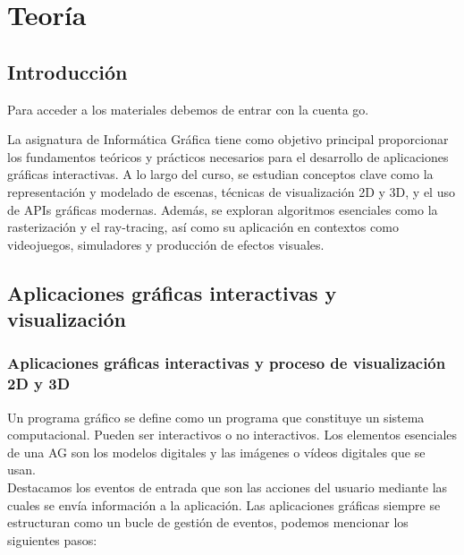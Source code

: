 \documentclass[12pt]{report} %
\begin{document}
\part{Teoría}

\hypertarget{introducciuxf3n}{%
\chapter{Introducción}\label{introducciuxf3n}}

Para acceder a los materiales debemos de entrar con la cuenta go.

La asignatura de Informática Gráfica tiene como objetivo principal
proporcionar los fundamentos teóricos y prácticos necesarios para el
desarrollo de aplicaciones gráficas interactivas. A lo largo del curso,
se estudian conceptos clave como la representación y modelado de
escenas, técnicas de visualización 2D y 3D, y el uso de APIs gráficas
modernas. Además, se exploran algoritmos esenciales como la
rasterización y el ray-tracing, así como su aplicación en contextos como
videojuegos, simuladores y producción de efectos visuales.

\hypertarget{aplicaciones-gruxe1ficas-interactivas-y-visualizaciuxf3n}{%
\chapter{Aplicaciones gráficas interactivas y
visualización}\label{aplicaciones-gruxe1ficas-interactivas-y-visualizaciuxf3n}}

\hypertarget{aplicaciones-gruxe1ficas-interactivas-y-proceso-de-visualizaciuxf3n-2d-y-3d}{%
\section{Aplicaciones gráficas interactivas y proceso de visualización
2D y
3D}\label{aplicaciones-gruxe1ficas-interactivas-y-proceso-de-visualizaciuxf3n-2d-y-3d}}

Un programa gráfico se define como un programa que constituye un sistema
computacional. Pueden ser interactivos o no interactivos. Los elementos
esenciales de una AG son los modelos digitales y las imágenes o vídeos
digitales que se usan.\\
Destacamos los eventos de entrada que son las acciones del usuario
mediante las cuales se envía información a la aplicación. Las
aplicaciones gráficas siempre se estructuran como un bucle de gestión de
eventos, podemos mencionar los siguientes pasos:
\end{document}
